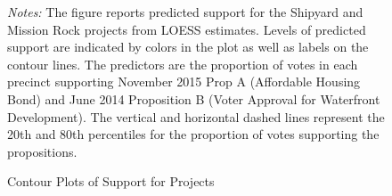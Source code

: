 \documentclass[article,12pt]{memoir}
\begin{document}
\begin{figure}[t]
  \caption{Contour Plots of Support for Projects}
  \label{fig:hg_g_contour}
  \begin{measuredfigure}
  \end{measuredfigure}
  \begin{tablenotes}[flushleft]
    \item \hspace{-.2em}\emph{Notes:} The figure reports predicted support for the Shipyard and Mission Rock projects from LOESS estimates.  Levels of predicted support are indicated by colors in the plot as well as labels on the contour lines.  The predictors are the proportion of votes in each precinct supporting November 2015 Prop A (Affordable Housing Bond) and June 2014 Proposition B (Voter Approval for Waterfront Development).  The vertical and horizontal dashed lines represent the 20th and 80th percentiles for the proportion of votes supporting the propositions.
  \end{tablenotes}
\end{figure}


\end{document}
